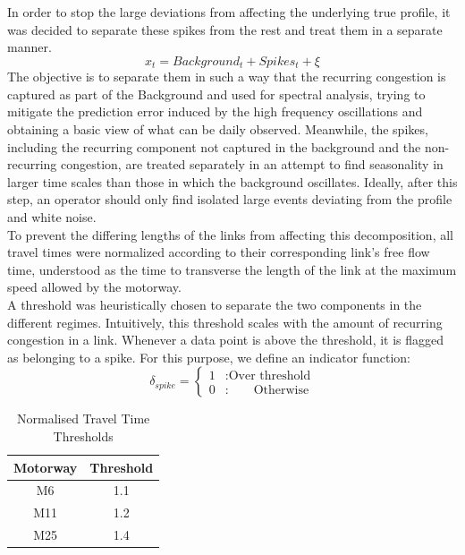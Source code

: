 \documentclass[conference]{IEEEtran}
\begin{document}
In order to stop the large deviations from affecting the underlying true profile, it was decided to separate these spikes from the rest and treat them in a separate manner.
\begin{equation}
x_t = Background_t + Spikes_t + \xi
\end{equation}
The objective is to separate them in such a way that the recurring congestion is captured as part of the Background and used for spectral analysis, trying to mitigate the prediction error induced by the high frequency oscillations and obtaining a basic view of what can be daily observed. Meanwhile, the spikes, including the recurring component not captured in the background and the non-recurring congestion, are treated separately in an attempt to find seasonality in larger time scales than those in which the background oscillates. Ideally, after this step, an operator should only find isolated large events deviating from the profile and white noise.\\

To prevent the differing lengths of the links from affecting this decomposition, all travel times were normalized according to their corresponding link's free flow time, understood as the time to transverse the length of the link at the maximum speed allowed by the motorway.\\

A threshold was heuristically chosen to separate the two components in the different regimes. Intuitively, this threshold scales with the amount of recurring congestion in a link. Whenever a data point is above the threshold, it is flagged as belonging to a spike.
For this purpose, we define an indicator function:\\
\begin{equation}
\delta_{spike}= \left\{
\begin{array}{lr}
1 & : \textrm{Over threshold}\\
0 & : \,\,\,\,\,\,\,\,\,\,\,\,\textrm{Otherwise}
\end{array}
\right.
\label{eq:delta}
\end{equation}


\begin{table}[htbp]
	\caption{Normalised Travel Time Thresholds}
	\begin{center}
		\begin{tabular}{|c|c|}
			\hline
			\textbf{Motorway}&{\textbf{Threshold}} \\
			\hline
			M6& 1.1\\
			\hline
			M11& 1.2\\
			\hline
			M25& 1.4\\
			\hline
		\end{tabular}
		\label{tab1}
	\end{center}
\end{table}
\end{document}
